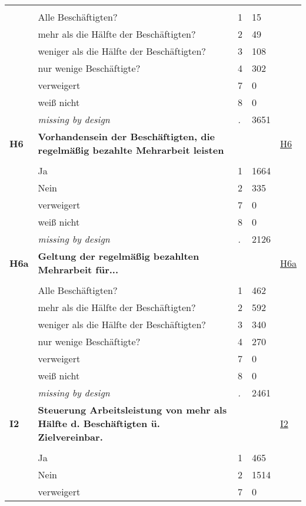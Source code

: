 \begin{longtable}{| L{2.65cm} | L{8cm} | C{1.5cm} | R{1.25cm} | C{2.25cm}  |}
   &  &  &  &  \\ 
   & Alle Beschäftigten? & 1 & 15 &  \\ 
   & mehr als die Hälfte der Beschäftigten? & 2 & 49 &  \\ 
   & weniger als die Hälfte der Beschäftigten? & 3 & 108 &  \\ 
   & nur wenige Beschäftigte? & 4 & 302 &  \\ 
   & verweigert & 7 & 0 &  \\ 
   & weiß nicht & 8 & 0 &  \\ 
   & \textit{missing by design} & \textit{.} & 3651 &  \\ 
   \midrule
\textbf{H6}\label{var:H6} & \textbf{Vorhandensein der Beschäftigten, die regelmäßig bezahlte Mehrarbeit leisten} &  &  & \hyperref[H6]{H6} \\ 
   &  &  &  &  \\ 
   & Ja & 1 & 1664 &  \\ 
   & Nein & 2 & 335 &  \\ 
   & verweigert & 7 & 0 &  \\ 
   & weiß nicht & 8 & 0 &  \\ 
   & \textit{missing by design} & \textit{.} & 2126 &  \\ 
   \midrule
\textbf{H6a}\label{var:H6a} & \textbf{Geltung der regelmäßig bezahlten Mehrarbeit für...} &  &  & \hyperref[H6a]{H6a} \\ 
   &  &  &  &  \\ 
   & Alle Beschäftigten? & 1 & 462 &  \\ 
   & mehr als die Hälfte der Beschäftigten? & 2 & 592 &  \\ 
   & weniger als die Hälfte der Beschäftigten? & 3 & 340 &  \\ 
   & nur wenige Beschäftigte? & 4 & 270 &  \\ 
   & verweigert & 7 & 0 &  \\ 
   & weiß nicht & 8 & 0 &  \\ 
   & \textit{missing by design} & \textit{.} & 2461 &  \\ 
   \midrule
\textbf{I2}\label{var:I2} & \textbf{Steuerung Arbeitsleistung von mehr als Hälfte d. Beschäftigten ü. Zielvereinbar.} &  &  & \hyperref[I2]{I2} \\ 
   &  &  &  &  \\ 
   & Ja & 1 & 465 &  \\ 
   & Nein & 2 & 1514 &  \\ 
   & verweigert & 7 & 0 &  \\ 

\end{longtable}
